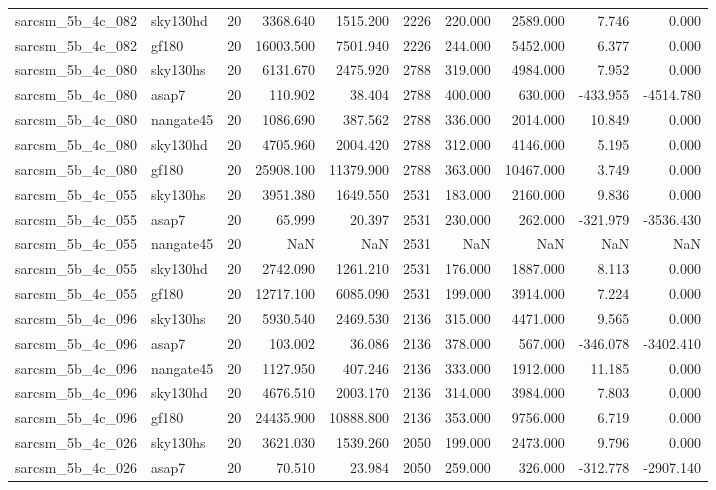 \documentclass{article}
\begin{document}
\begin{longtable}{llrrrrrrrr}
sarcsm\_5b\_4c\_082 & sky130hd & 20 & 3368.640 & 1515.200 & 2226 & 220.000 & 2589.000 & 7.746 & 0.000 \\
sarcsm\_5b\_4c\_082 & gf180 & 20 & 16003.500 & 7501.940 & 2226 & 244.000 & 5452.000 & 6.377 & 0.000 \\
sarcsm\_5b\_4c\_080 & sky130hs & 20 & 6131.670 & 2475.920 & 2788 & 319.000 & 4984.000 & 7.952 & 0.000 \\
sarcsm\_5b\_4c\_080 & asap7 & 20 & 110.902 & 38.404 & 2788 & 400.000 & 630.000 & -433.955 & -4514.780 \\
sarcsm\_5b\_4c\_080 & nangate45 & 20 & 1086.690 & 387.562 & 2788 & 336.000 & 2014.000 & 10.849 & 0.000 \\
sarcsm\_5b\_4c\_080 & sky130hd & 20 & 4705.960 & 2004.420 & 2788 & 312.000 & 4146.000 & 5.195 & 0.000 \\
sarcsm\_5b\_4c\_080 & gf180 & 20 & 25908.100 & 11379.900 & 2788 & 363.000 & 10467.000 & 3.749 & 0.000 \\
sarcsm\_5b\_4c\_055 & sky130hs & 20 & 3951.380 & 1649.550 & 2531 & 183.000 & 2160.000 & 9.836 & 0.000 \\
sarcsm\_5b\_4c\_055 & asap7 & 20 & 65.999 & 20.397 & 2531 & 230.000 & 262.000 & -321.979 & -3536.430 \\
sarcsm\_5b\_4c\_055 & nangate45 & 20 & NaN & NaN & 2531 & NaN & NaN & NaN & NaN \\
sarcsm\_5b\_4c\_055 & sky130hd & 20 & 2742.090 & 1261.210 & 2531 & 176.000 & 1887.000 & 8.113 & 0.000 \\
sarcsm\_5b\_4c\_055 & gf180 & 20 & 12717.100 & 6085.090 & 2531 & 199.000 & 3914.000 & 7.224 & 0.000 \\
sarcsm\_5b\_4c\_096 & sky130hs & 20 & 5930.540 & 2469.530 & 2136 & 315.000 & 4471.000 & 9.565 & 0.000 \\
sarcsm\_5b\_4c\_096 & asap7 & 20 & 103.002 & 36.086 & 2136 & 378.000 & 567.000 & -346.078 & -3402.410 \\
sarcsm\_5b\_4c\_096 & nangate45 & 20 & 1127.950 & 407.246 & 2136 & 333.000 & 1912.000 & 11.185 & 0.000 \\
sarcsm\_5b\_4c\_096 & sky130hd & 20 & 4676.510 & 2003.170 & 2136 & 314.000 & 3984.000 & 7.803 & 0.000 \\
sarcsm\_5b\_4c\_096 & gf180 & 20 & 24435.900 & 10888.800 & 2136 & 353.000 & 9756.000 & 6.719 & 0.000 \\
sarcsm\_5b\_4c\_026 & sky130hs & 20 & 3621.030 & 1539.260 & 2050 & 199.000 & 2473.000 & 9.796 & 0.000 \\
sarcsm\_5b\_4c\_026 & asap7 & 20 & 70.510 & 23.984 & 2050 & 259.000 & 326.000 & -312.778 & -2907.140 \\

\end{longtable}
\end{document}
